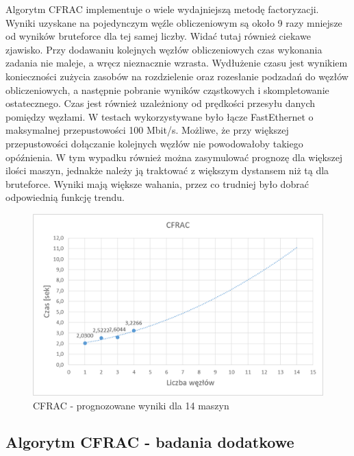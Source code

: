 \documentclass{article}
\begin{document}
Algorytm CFRAC implementuje o wiele wydajniejszą metodę factoryzacji. Wyniki uzyskane na pojedynczym węźle obliczeniowym są około 9 razy mniejsze od wyników bruteforce dla tej samej liczby. Widać tutaj również ciekawe zjawisko. Przy dodawaniu kolejnych węzłów obliczeniowych czas wykonania zadania nie maleje, a wręcz nieznacznie wzrasta. Wydłużenie czasu jest wynikiem konieczności zużycia zasobów na rozdzielenie oraz rozesłanie podzadań do węzłów obliczeniowych, a następnie pobranie wyników cząstkowych i skompletowanie ostatecznego. Czas jest również uzależniony od prędkości przesyłu danych pomiędzy węzłami. W testach wykorzystywane było łącze FastEthernet o maksymalnej przepustowości 100 Mbit/s. Możliwe, że przy większej przepustowości dołączanie kolejnych węzłów nie powodowałoby takiego opóźnienia. W tym wypadku również można zasymulować prognozę dla większej ilości maszyn, jednakże należy ją traktować z większym dystansem niż tą dla bruteforce. Wyniki mają większe wahania, przez co trudniej było dobrać odpowiednią funkcję trendu.


\begin{figure}[h!]
    \includegraphics[width=\linewidth]{CFRAC_prognoza.png}
    \caption{CFRAC - prognozowane wyniki dla 14 maszyn}
    \label{fig:userpagescr}
\end{figure}

\clearpage
\subsection{Algorytm CFRAC - badania dodatkowe}
\end{document}
